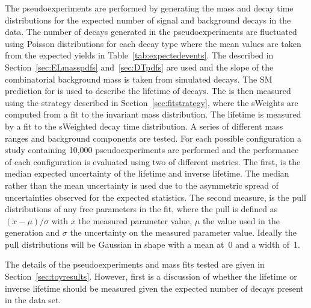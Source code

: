 {The pseudoexperiments are performed by generating the mass and decay time distributions for the expected number of signal and background decays in the data. The number of decays generated in the pseudoexperiments are fluctuated using Poisson distributions for each decay type where the mean values are taken from the expected yields in Table~\ref{tab:expectedevents}. The \pdfs described in Section~\ref{sec:ELmasspdfs} and~\ref{sec:DTpdfs} are used and the slope of the combinatorial background mass \pdf is taken from simulated \bbbarmumux decays. The SM prediction for \tmumu is used to describe the lifetime of \bsmumu decays. %
The \el is then measured using the strategy described in Section~\ref{sec:fitstrategy}, where the sWeights are computed from a fit to the invariant mass distribution. The lifetime is measured by a fit to the sWeighted decay time distribution. A series of different mass ranges and background components are tested. For each possible configuration a study containing 10,000 pseudoexperiments are performed and the performance of each configuration is evaluated using two of different metrics. The first, is the median expected uncertainty of the \bsmumu lifetime and inverse lifetime. The median rather than the mean uncertainty is used due to the asymmetric spread of uncertainties observed for the expected statistics. The second measure, is the pull distributions of any free parameters in the fit, where the pull is defined as $(x - \mu)/\sigma$ with $x$ the measured parameter value, $\mu$ the value used in the generation and $\sigma$ the uncertainty on the measured parameter value. Ideally the pull distributions will be Gaussian in shape with a mean at~0 and a width of~1.

 The details of the pseudoexperiments and mass fits tested are given in Section~\ref{sec:toyresults}. However, first is a discussion of whether the lifetime or inverse lifetime should be measured given the expected number of decays present in the data set.  

}
